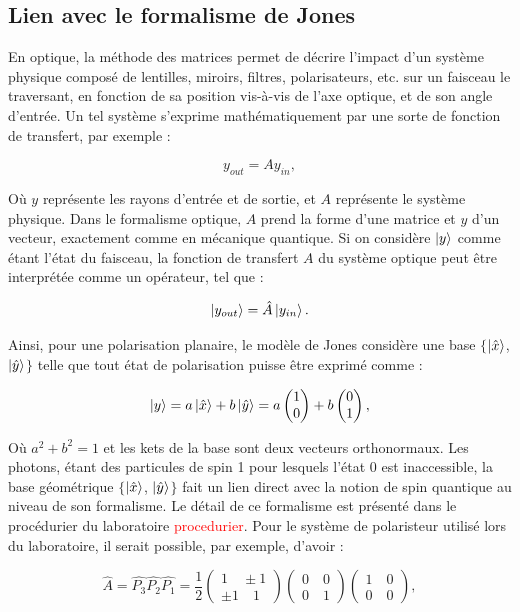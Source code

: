 \documentclass[11pt,letterpaper]{article}
\newcommand*{\Coord}[2]{%
    \begin{pmatrix} 
      #1\\ 
      #2 
    \end{pmatrix}}
\begin{document}
\subsection{Lien avec le formalisme de Jones}\label{jonesjones}

En optique, la méthode des matrices permet de décrire l'impact d'un système physique composé de lentilles, miroirs, filtres, 
polarisateurs, etc. sur un faisceau le traversant, en fonction de sa position vis-à-vis de l'axe optique, et de son angle 
d'entrée. Un tel système s'exprime mathématiquement par une sorte de fonction de transfert, par exemple : 

\begin{equation}
    y_{out} = Ay_{in},
\end{equation}

Où $y$  représente les rayons d'entrée et de sortie, et $A$ représente le système physique. Dans le formalisme optique, $A$ 
prend la forme d'une matrice et $y$ d'un vecteur, exactement comme en mécanique quantique. Si on considère $\ket{y}$ comme 
étant l'état du faisceau, la fonction de transfert $A$ du système optique peut être interprétée comme un opérateur, tel que : 

\begin{equation}
    \ket{y_{out}} = \hat{A}\ket{y_{in}}.
\end{equation}

Ainsi, pour une polarisation planaire, le modèle de Jones considère une base $\{$$\ket{\hat{x}}$, $\ket{\hat{y}}$$\}$ telle 
que tout état de polarisation puisse être exprimé comme :

\begin{equation}
    \ket{y} = a\ket{\hat{x}} + b\ket{\hat{y}} = a\Coord{1}{0} + b\Coord{0}{1},
\end{equation}

Où $a^2 + b^2 = 1$ et les kets de la base sont deux vecteurs orthonormaux. Les photons, étant des particules de spin 1 pour 
lesquels l'état 0 est inaccessible, la base géométrique $\{$$\ket{\hat{x}}$, $\ket{\hat{y}}$$\}$ fait un lien direct avec 
la notion de spin quantique au niveau de son formalisme. Le détail de ce formalisme est présenté dans le procédurier du 
laboratoire \textcolor{red}{procedurier}. Pour le système de polaristeur utilisé lors du laboratoire, il serait possible, par
exemple, d'avoir  : 

\begin{equation*}
    \hat{A} = \hat{P_3}\hat{P_2}\hat{P_1} = \frac{1}{2}\Coord{1 \quad \pm 1}{\pm 1 \quad 1}\Coord{0 \quad 0}{0 \quad 1}\Coord{1 \quad 0}{0 \quad 0},
\end{equation*}
\end{document}

